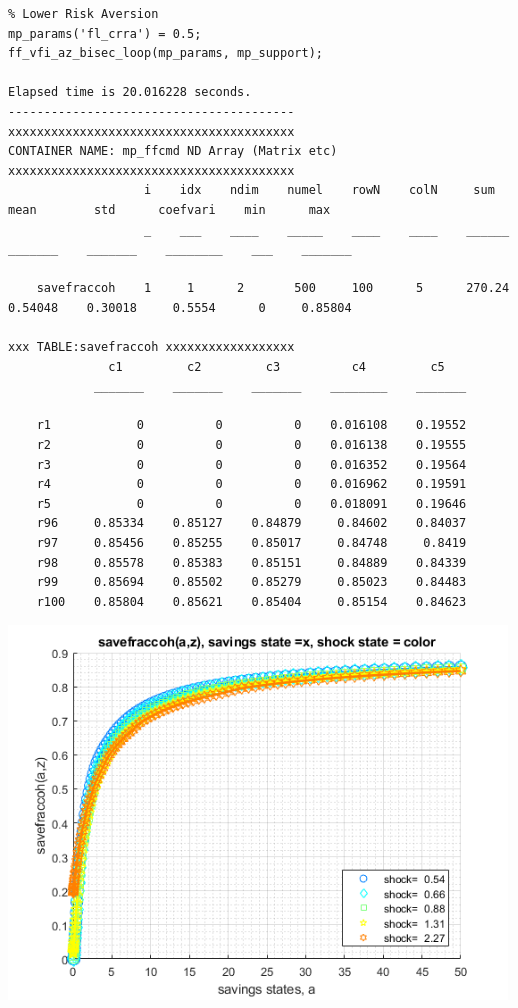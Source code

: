 \documentclass[
]{book}
\begin{document}
\begin{verbatim}
% Lower Risk Aversion
mp_params('fl_crra') = 0.5;
ff_vfi_az_bisec_loop(mp_params, mp_support);

Elapsed time is 20.016228 seconds.
----------------------------------------
xxxxxxxxxxxxxxxxxxxxxxxxxxxxxxxxxxxxxxxx
CONTAINER NAME: mp_ffcmd ND Array (Matrix etc)
xxxxxxxxxxxxxxxxxxxxxxxxxxxxxxxxxxxxxxxx
                   i    idx    ndim    numel    rowN    colN     sum       mean        std      coefvari    min      max  
                   _    ___    ____    _____    ____    ____    ______    _______    _______    ________    ___    _______

    savefraccoh    1     1      2       500     100      5      270.24    0.54048    0.30018     0.5554      0     0.85804

xxx TABLE:savefraccoh xxxxxxxxxxxxxxxxxx
              c1         c2         c3          c4         c5   
            _______    _______    _______    ________    _______

    r1            0          0          0    0.016108    0.19552
    r2            0          0          0    0.016138    0.19555
    r3            0          0          0    0.016352    0.19564
    r4            0          0          0    0.016962    0.19591
    r5            0          0          0    0.018091    0.19646
    r96     0.85334    0.85127    0.84879     0.84602    0.84037
    r97     0.85456    0.85255    0.85017     0.84748     0.8419
    r98     0.85578    0.85383    0.85151     0.84889    0.84339
    r99     0.85694    0.85502    0.85279     0.85023    0.84483
    r100    0.85804    0.85621    0.85404     0.85154    0.84623
\end{verbatim}

\includegraphics[width=5.20833in,height=\textheight]{img/fx_vfi_az_bisec_loop_images/figure_2.png}
\end{document}
